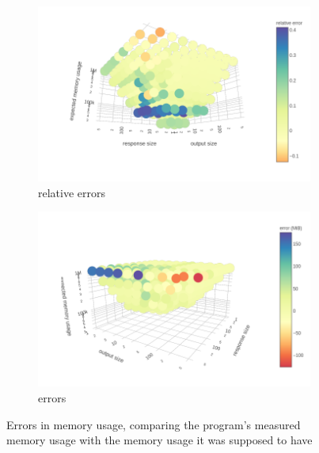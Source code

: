 \documentclass{article}
\begin{document}
\begin{figure}
  \centering
  \begin{subfigure}[t]{0.49\textwidth}
    \centering
    \includegraphics[width=\textwidth]{../local_experiments/io_memory_tests/plots/posterior_relative_errors.png}
    \caption{relative errors}
  \end{subfigure}
  \begin{subfigure}[t]{0.49\textwidth}
    \centering
    \includegraphics[width=\textwidth]{../local_experiments/io_memory_tests/plots/posterior_errors.png}
    \caption{errors}
  \end{subfigure}
  \caption{Errors in memory usage, comparing the program's measured memory usage
    with the memory usage it was supposed to have}
  \label{fig:posterior_errors}
\end{figure}
\end{document}
